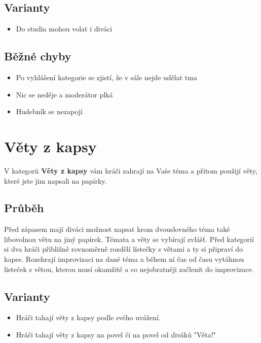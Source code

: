 \documentclass[main.tex]{subfiles}
\begin{document}
\subsection{ Varianty } \begin{itemize}
\item Do studia mohou volat i diváci
\end{itemize}
 
\subsection{ Běžné chyby } \begin{itemize}
\item Po vyhlášení kategorie se zjistí, že v sále nejde udělat tma
\item Nic se neděje a moderátor plká
\item Hudebník se nezapojí
\end{itemize}
 
 
 
 
 
 
\needspace{5cm} \section{Věty z kapsy} \label{věty z kapsy}  
 
 
V kategorii \textbf{Věty z kapsy}{} vám hráči zahrají na Vaše téma a přitom použijí věty, které jste jim napsali na papírky. 
 
 
\subsection{Průběh} Před zápasem mají diváci možnost napsat krom dvouslovného téma také libovolnou větu na jiný papírek. Témata a věty se vybírají zvlášť. Před kategorií si dva hráči přibližně rovnoměrně rozdělí lístečky s větami a ty si připraví do kapes. Rozehrají improvizaci na dané téma a během ní čas od času vytáhnou lísteček s větou, kterou musí okamžitě a co nejobratněji začlenit do improvizace.  
 
 
\subsection{ Varianty } \begin{itemize}
\item Hráči tahají věty z kapsy podle svého uvážení.
\item Hráči tahají věty z kapsy na povel  či na povel od diváků "Věta!"
\end{itemize}
 
\end{document}

